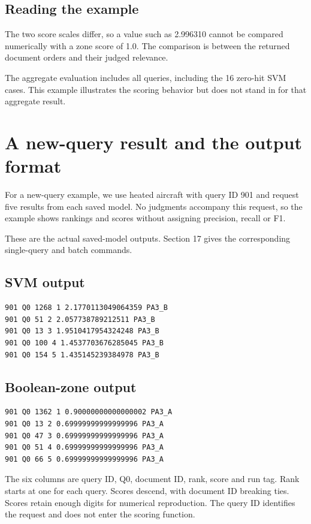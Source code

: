 \documentclass[12pt,a4paper]{article}
\begin{document}
\subsection{Reading the example}
The two score scales differ, so a value such as 2.996310 cannot be compared numerically with a zone score of 1.0. The comparison is between the returned document orders and their judged relevance.

The aggregate evaluation includes all queries, including the 16 zero-hit SVM cases. This example illustrates the scoring behavior but does not stand in for that aggregate result.

\section{A new-query result and the output format}
For a new-query example, we use heated aircraft with query ID 901 and request five results from each saved model. No judgments accompany this request, so the example shows rankings and scores without assigning precision, recall or F1.

These are the actual saved-model outputs. Section 17 gives the corresponding single-query and batch commands.

\subsection{SVM output}
\begin{small}\begin{verbatim}
901 Q0 1268 1 2.1770113049064359 PA3_B
901 Q0 51 2 2.057738789212511 PA3_B
901 Q0 13 3 1.9510417954324248 PA3_B
901 Q0 100 4 1.4537703676285045 PA3_B
901 Q0 154 5 1.435145239384978 PA3_B
\end{verbatim}\end{small}
\subsection{Boolean-zone output}
\begin{small}\begin{verbatim}
901 Q0 1362 1 0.90000000000000002 PA3_A
901 Q0 13 2 0.69999999999999996 PA3_A
901 Q0 47 3 0.69999999999999996 PA3_A
901 Q0 51 4 0.69999999999999996 PA3_A
901 Q0 66 5 0.69999999999999996 PA3_A
\end{verbatim}\end{small}
The six columns are query ID, Q0, document ID, rank, score and run tag. Rank starts at one for each query. Scores descend, with document ID breaking ties. Scores retain enough digits for numerical reproduction. The query ID identifies the request and does not enter the scoring function.
\end{document}
